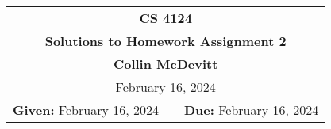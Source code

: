 \documentclass[11pt,twoside]{article}
\newcommand{\coursenumber}{CS 4124}
\newcommand{\docdate}{January 30, 2024}
\newcommand{\duedate}{February 16, 2024}
\newcommand{\homeworknumber}{2}
\newcommand{\doctitle}{Solutions to Homework Assignment \homeworknumber}
\newcommand{\doctitle}{Homework Assignment \homeworknumber}
\renewcommand{\docdate}{\duedate}
\renewcommand{\author}{Collin McDevitt}
\begin{document}
\thispagestyle{empty}

\begin{center}
\begin{tabular}{lcr}
\multicolumn{3}{c}{\Large\textbf{\coursenumber}}
\\[0.04in]
\multicolumn{3}{c}{\Large\textbf{\doctitle}}
\ifthenelse{\boolean{solutions}}{%
\\[0.04in]\multicolumn{3}{c}{\large\textbf{\author}}
}{} %
\ifthenelse{\boolean{solutions}}{%
\\[0.10in]\multicolumn{3}{c}{\duedate}
}{%
\\[0.10in]
\textbf{Given:} \docdate
& \hspace*{1.0in} &
\textbf{Due:} \duedate
}
\end{tabular}
\end{center}
\end{document}
